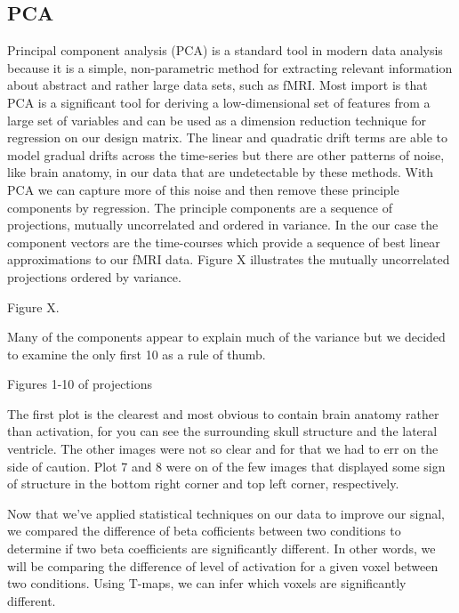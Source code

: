 \documentclass[11pt]{article}
\begin{document}
\subsection{PCA}
Principal component analysis (PCA) is a standard tool in modern data analysis 
because it is a simple, non-parametric method for extracting relevant 
information about abstract and rather large data sets, such as fMRI.  Most 
import is that PCA is a significant tool for deriving a low-dimensional set of 
features from a large set of variables and can be used as a dimension reduction 
technique for regression on our design matrix. The linear and quadratic drift 
terms are able to model gradual drifts across the time-series but there are 
other patterns of noise, like brain anatomy, in our data that are undetectable 
by these methods. With PCA we can capture more of this noise and then remove 
these principle components by regression. The principle components are a 
sequence of projections, mutually uncorrelated and ordered in variance. In the 
our case the component vectors are the time-courses which provide a sequence of 
best linear approximations to our fMRI data.  Figure X illustrates the mutually 
uncorrelated projections ordered by variance.

	Figure X.

Many of the  components appear to explain much of the variance but we decided 
to examine the only first 10 as a rule of thumb.

	Figures 1-10 of projections

The first plot is the clearest and most obvious to contain brain anatomy rather 
than activation, for you can see the surrounding skull structure and the 
lateral ventricle. The other images were not so clear and for that we had to 
err on the side of caution. Plot 7 and 8 were on of the few images that 
displayed some sign of structure in the bottom right corner and top left 
corner, respectively.

\subject{Result}

Now that we've applied statistical techniques on our data to improve our signal, we compared the difference of beta cofficients between two conditions to determine if two beta coefficients are significantly different. In other words, we will be comparing the difference of level of activation for a given voxel between two conditions. Using T-maps, we can infer which voxels are significantly different.
\end{document}
